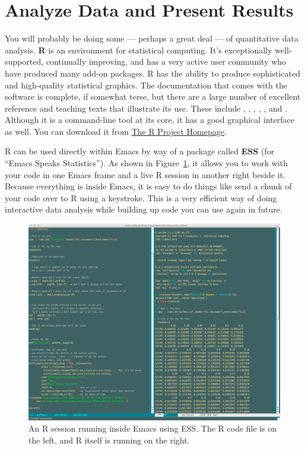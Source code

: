 \documentclass[11pt,article]{memoir}
\begin{document}
\section{Analyze Data and Present Results} 
You will probably be doing some --- perhaps a great deal --- of quantitative data analysis. \textbf{R} is an environment for statistical computing. It's exceptionally well-supported, continually improving, and has a very active user community who have produced many add-on packages. R has the ability to produce sophisticated and high-quality statistical graphics. The documentation that comes with the software is complete, if somewhat terse, but there are a large number of excellent reference and teaching texts that illustrate its use. These include \citet{dalgaard02:_introd_statis_r}, \citet{venables02:_moder_applied_statis_s_plus}, \citet{maindonald03:_data_analy_graph_using_r}, \citet{fox02:_r_s_plus_compan_applied_regres}, \citet{frank01:_regres_model_strat}, and 
\citet{gelmanhill07:data_analysis}. Although it is a command-line tool at its core, it has a good graphical interface as well. You can download it from \href{http://www.r-project.org/}{The R Project Homepage}.     

R can be used directly within Emacs by way of a package called \textbf{ESS}
(for ``Emacs Speaks Statistics''). As shown in Figure~\ref{fig:ess}, it allows you to work with your code in one Emacs frame and a live R session in another right beside it. Because everything is inside Emacs, it is easy to do things like send a chunk of your code over to R using a keystroke. This is a very efficient way of doing interactive data analysis while building up code you can use again in future.  

\begin{figure}[h]
	\centering
		\includegraphics[scale=0.25]{figures/EmacsESS2}
	\caption{An R session running inside Emacs using ESS. The R code file is on the left, and R itself is running on the right.}
	\label{fig:ess}
\end{figure}
                           
\end{document}
